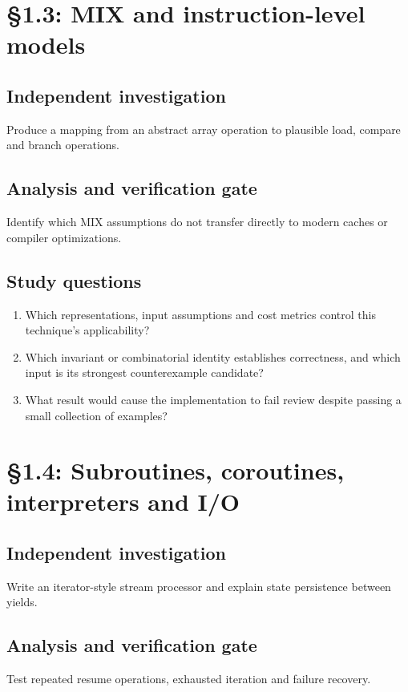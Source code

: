 \documentclass[11pt,letterpaper]{article}
\begin{document}
\section{\S 1.3: MIX and instruction-level models}
\subsection{Independent investigation}
Produce a mapping from an abstract array operation to plausible load, compare and branch operations.
\subsection{Analysis and verification gate}
Identify which MIX assumptions do not transfer directly to modern caches or compiler optimizations.
\subsection{Study questions}
\begin{enumerate}
\item Which representations, input assumptions and cost metrics control this technique's applicability?
\item Which invariant or combinatorial identity establishes correctness, and which input is its strongest counterexample candidate?
\item What result would cause the implementation to fail review despite passing a small collection of examples?
\end{enumerate}

\section{\S 1.4: Subroutines, coroutines, interpreters and I/O}
\subsection{Independent investigation}
Write an iterator-style stream processor and explain state persistence between yields.
\subsection{Analysis and verification gate}
Test repeated resume operations, exhausted iteration and failure recovery.
\end{document}
